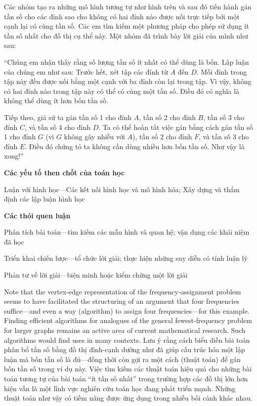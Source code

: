 \documentclass[
  10pt,
  a4paper,
  landscape,
  twoside,
  openany
]{scrbook}
\newcommand{\EN}[1]{#1}
\newcommand{\VI}[1]{#1}
\newcommand{\NOTE}[1]{#1}
\newcounter{example}
\begin{document}
{Các nhóm tạo ra những mô hình tương tự như hình trên và sau đó tiến hành gán tần số cho các đỉnh sao cho không có hai đỉnh nào được nối trực tiếp bởi một cạnh lại có cùng tần số. Các em tìm kiếm một phương pháp cho phép sử dụng ít tần số nhất cho đồ thị cụ thể này. Một nhóm đã trình bày lời giải của mình như sau:

``Chúng em nhận thấy rằng số lượng tần số ít nhất có thể dùng là bốn. Lập luận của chúng em như sau: Trước hết, xét tập các đỉnh từ $A$ đến $D$. Mỗi đỉnh trong tập này đều được nối bằng một cạnh với ba đỉnh còn lại trong tập. Vì vậy, không có hai đỉnh nào trong tập này có thể có cùng một tần số. Điều đó có nghĩa là không thể dùng ít hơn bốn tần số.

Tiếp theo, giả sử ta gán tần số 1 cho đỉnh $A$, tần số 2 cho đỉnh $B$, tần số 3 cho đỉnh $C$, và tần số 4 cho đỉnh $D$. Ta có thể hoàn tất việc gán bằng cách gán tần số 1 cho đỉnh $G$ (vì $G$ không gây nhiễu với $A$), tần số 2 cho đỉnh $F$, và tần số 3 cho đỉnh $E$. Điều đó chứng tỏ ta không cần dùng nhiều hơn bốn tần số. Như vậy là xong!''

\noindent
\textbf{Các yếu tố then chốt của toán học}

Luận với hình học---Các kết nối hình học và mô hình hóa; Xây dựng và thẩm định các lập luận hình học

\noindent
\textbf{Các thói quen luận}

Phân tích bài toán---tìm kiếm các mẫu hình và quan hệ; vận dụng các khái niệm đã học

Triển khai chiến lược---tổ chức lời giải; thực hiện những suy diễn có tính luận lý

Phản tư về lời giải---biện minh hoặc kiểm chứng một lời giải
}
{}

\TriPara
{
\EN{Note that the vertex-edge representation of the frequency-assignment problem seems to have facilitated the structuring of an argument that four frequencies suffice---and even a way (algorithm) to assign four frequencies---for this example. Finding efficient algorithms for analogues of the general fewest-frequency problem for larger graphs remains an active area of current mathematical research. Such algorithms would find uses in many contexts.}
}
{
\VI{Lưu ý rằng cách biểu diễn bài toán phân bổ tần số bằng đồ thị đỉnh-cạnh dường như đã giúp cấu trúc hóa một lập luận mà bốn tần số là đủ---đồng thời còn gợi ra một cách (thuật toán) để gán bốn tần số trong ví dụ này. Việc tìm kiếm các thuật toán hiệu quả cho những bài toán tương tự của bài toán ``ít tần số nhất'' trong trường hợp các đồ thị lớn hơn hiện vẫn là một lĩnh vực nghiên cứu toán học đang phát triển mạnh. Những thuật toán như vậy có tiềm năng được ứng dụng trong nhiều bối cảnh khác nhau.}
}
{
\NOTE{}
}
\end{document}
